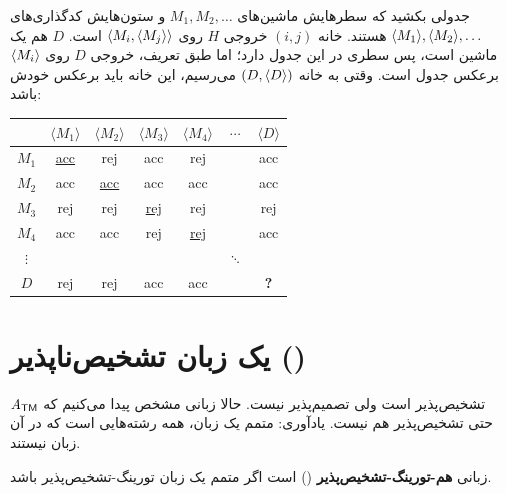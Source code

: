 \begin{note}
جدولی بکشید که سطرهایش ماشین‌های $M_1,M_2,\dots$ و ستون‌هایش کدگذاری‌های $\langle M_1\rangle,\langle M_2\rangle,\dots$ هستند. خانه $(i,j)$ خروجی $H$ روی $\langle M_i,\langle M_j\rangle\rangle$ است. $D$ هم یک ماشین است، پس سطری در این جدول دارد؛ اما طبق تعریف، خروجی $D$ روی $\langle M_i\rangle$ برعکس  جدول است. وقتی به خانه $(D,\langle D\rangle)$ می‌رسیم، این خانه باید برعکس خودش باشد:
\begin{ltrfig}
\small
\begin{tabular}{c|cccccc}
 & $\langle M_1\rangle$ & $\langle M_2\rangle$ & $\langle M_3\rangle$ & $\langle M_4\rangle$ & $\cdots$ & $\langle D\rangle$\\ \hline
$M_1$ & \underline{acc} & rej & acc & rej & & acc\\
$M_2$ & acc & \underline{acc} & acc & acc & & acc\\
$M_3$ & rej & rej & \underline{rej} & rej & & rej\\
$M_4$ & acc & acc & rej & \underline{rej} & & acc\\
$\vdots$ & & & & & $\ddots$ & \\
$D$ & rej & rej & acc & acc & & \textbf{?}
\end{tabular}
\end{ltrfig}
\end{note}

\section{یک زبان تشخیص‌ناپذیر ()}

$\mathit{A}_{\mathsf{TM}}$ تشخیص‌پذیر است ولی تصمیم‌پذیر نیست. حالا زبانی مشخص پیدا می‌کنیم که حتی تشخیص‌پذیر هم نیست. یادآوری: متمم یک زبان، همه رشته‌هایی است که در آن زبان نیستند.

\begin{definition}
زبانی \textbf{هم-تورینگ-تشخیص‌پذیر} () است اگر متمم یک زبان تورینگ-تشخیص‌پذیر باشد.
\end{definition}

